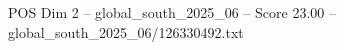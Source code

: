 \begin{textsample}{POS Dim 2 – global\_south\_2025\_06 – Score 23.00 – global\_south\_2025\_06/126330492.txt}
\end{textsample}
